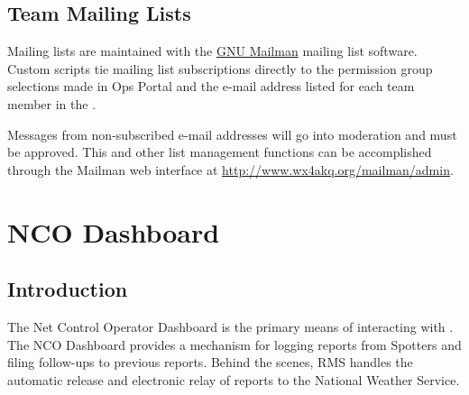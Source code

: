 \documentclass[pdflatex,letterpaper,twoside,12pt]{book}
\begin{document}
\section{Team Mailing Lists}\label{mailing-lists}

Mailing lists are maintained with the \href{http://www.list.org/}{GNU Mailman} mailing list software.  Custom scripts tie mailing list subscriptions directly to the permission group selections made in Ops Portal and the e-mail address listed for each team member in the .

Messages from non-subscribed e-mail addresses will go into moderation and must be approved.  This and other list management functions can be accomplished through the Mailman web interface at \href{http://www.wx4akq.org/mailman/admin}{http://www.wx4akq.org/mailman/admin}.



\chapter{NCO Dashboard}\label{nco-dashboard}

\section{Introduction}

The Net Control Operator Dashboard is the primary means of interacting with .  The NCO Dashboard provides a mechanism for logging reports from Spotters and filing follow-ups to previous reports.  Behind the scenes, RMS handles the automatic release and electronic relay of reports to the National Weather Service.
\end{document}
